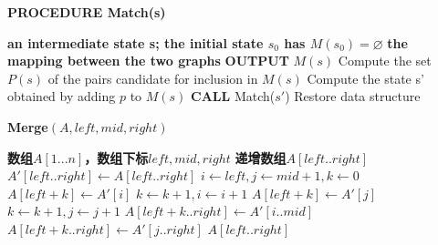 \documentclass{article}
\begin{document}
\begin{CJK}{UTF8}{gbsn}
     \begin{algorithm}
                \caption{\textbf{PROCEDURE Match(s)}}
                \begin{algorithmic}[1]
                    \Require \textbf{an intermediate state s; the initial state $s_0$ has $M(s_0)=\varnothing$}
                    \Ensure \textbf{the mapping between the two graphs}
                        \State \textbf{OUTPUT} $M(s)$
                    \Else
                        \State Compute the set $P(s)$ of the pairs candidate for inclusion in $M(s)$
                                \State Compute the state s' obtained by adding $p$ to $M(s)$
                                \State \textbf{CALL} Match($s'$)
                            \EndIf
                        \EndFor
                        \State Restore data structure
                    \EndIf
            \end{algorithmic}
        \end{algorithm}

        \begin{algorithm}
            \caption{\textbf{Merge$(A,left,mid,right)$}}
            \begin{algorithmic}[1]
                \Require \textbf{数组$A[1...n]$，数组下标$left,mid,right$}
                \Ensure \textbf{递增数组$A[left..right]$}
                \State $A'[left..right] \leftarrow A[left..right]$
                \State $i \leftarrow left, j \leftarrow mid+1,k \leftarrow 0$
                        \State $A[left+k] \leftarrow A'[i]$
                        \State $k \leftarrow k+1, i \leftarrow i+1$
                    \Else
                        \State $A[left+k] \leftarrow A'[j]$
                        \State $k \leftarrow k+1, j \leftarrow j+1$
                    \EndIf
                \EndWhile
                    \State $A[left+k..right] \leftarrow A'[i..mid]$
                \Else
                    \State $A[left+k..right] \leftarrow A'[j..right]$
                \EndIf
                \State \Return $A[left..right]$
            \end{algorithmic}
        \end{algorithm}


\end{CJK}
\end{document}
